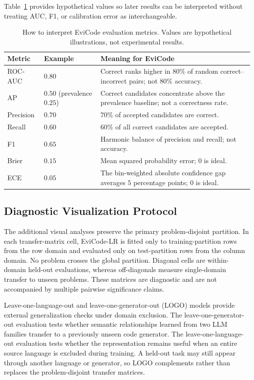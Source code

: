 \documentclass[conference]{IEEEtran}
\begin{document}
Table~\ref{tab:metric-reading} provides hypothetical values so later results can be interpreted without treating AUC, F1, or calibration error as interchangeable.

\begin{table}[t]
\centering
\caption{How to interpret EviCode evaluation metrics. Values are hypothetical illustrations, not experimental results.}
\label{tab:metric-reading}
\footnotesize
\begin{tabular}{@{}p{}p{}p{}@{}}
\toprule
Metric & Example & Meaning for EviCode \\
\midrule
ROC-AUC & $0.80$ & Correct ranks higher in $80\%$ of random correct--incorrect pairs; not $80\%$ accuracy. \\
AP & $0.50$ (prevalence $0.25$) & Correct candidates concentrate above the prevalence baseline; not a correctness rate. \\
Precision & $0.70$ & $70\%$ of accepted candidates are correct. \\
Recall & $0.60$ & $60\%$ of all correct candidates are accepted. \\
F1 & $0.65$ & Harmonic balance of precision and recall; not accuracy. \\
Brier & $0.15$ & Mean squared probability error; $0$ is ideal. \\
ECE & $0.05$ & The bin-weighted absolute confidence gap averages $5$ percentage points; $0$ is ideal. \\
\bottomrule
\end{tabular}
\end{table}

\subsection{Diagnostic Visualization Protocol}
The additional visual analyses preserve the primary problem-disjoint partition. In each transfer-matrix cell, EviCode-LR is fitted only to training-partition rows from the row domain and evaluated only on test-partition rows from the column domain. No problem crosses the global partition. Diagonal cells are within-domain held-out evaluations, whereas off-diagonals measure single-domain transfer to unseen problems. These matrices are diagnostic and are not accompanied by multiple pairwise significance claims.

Leave-one-language-out and leave-one-generator-out (LOGO) models provide external generalization checks under domain exclusion. The leave-one-generator-out evaluation tests whether semantic relationships learned from two LLM families transfer to a previously unseen code generator. The leave-one-language-out evaluation tests whether the representation remains useful when an entire source language is excluded during training. A held-out task may still appear through another language or generator, so LOGO complements rather than replaces the problem-disjoint transfer matrices.
\end{document}
